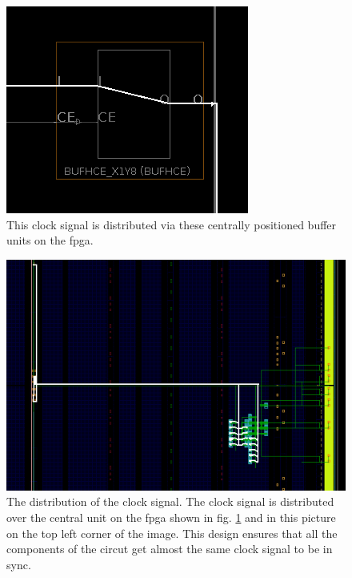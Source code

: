 \begin{figure}[h]
	\centering
	\includegraphics[width=.6\linewidth]{./L3/E3/BUFHCE.png}
	\caption{This clock signal is distributed via these centrally positioned buffer units on the \gls{fpga}.} 
	\label{fig: clock  e_3_3_1}
\end{figure}

\begin{figure}[h]
	\centering
	\includegraphics[width=.8\linewidth]{./L3/E3/CLK.png}
	\caption{The distribution of the clock signal. The clock signal is distributed over the central unit on the \gls{fpga} shown in fig. \ref*{fig: clock  e_3_3_1} and in this picture on the top left corner of the image. This design ensures that all the components of the circut get almost the same clock signal to be in sync.}
	\label{fig: clock routing e_3_3_1}
\end{figure}

%

%



